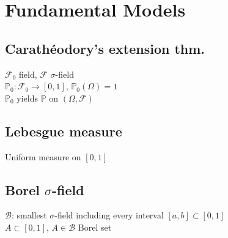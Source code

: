 \section{Fundamental Models}

	\subsection*{Carath\'eodory's extension thm.}
	$\mathcal{F}_{0}$ field, $\mathcal{F}$ $\sigma$-field\\
	$\mathbb{P}_{0}: \mathcal{F}_{0}\to\left[0, 1\right]$, $\mathbb{P}_{0}\left(\Omega\right) = 1$\\
	$\mathbb{P}_{0}$ yields $\mathbb{P}$ on $\left(\Omega, \mathcal{F}\right)$
	
	\subsection*{Lebesgue measure}
	Uniform measure on $\left[0, 1\right]$
	
	\subsection*{Borel $\sigma$-field}
	$\mathcal{B}$: smallest $\sigma$-field including every interval $\left[a, b\right]\subset\left[0, 1\right]$\\
	$A\subset\left[0, 1\right]$, $A\in\mathcal{B}$ Borel set
	